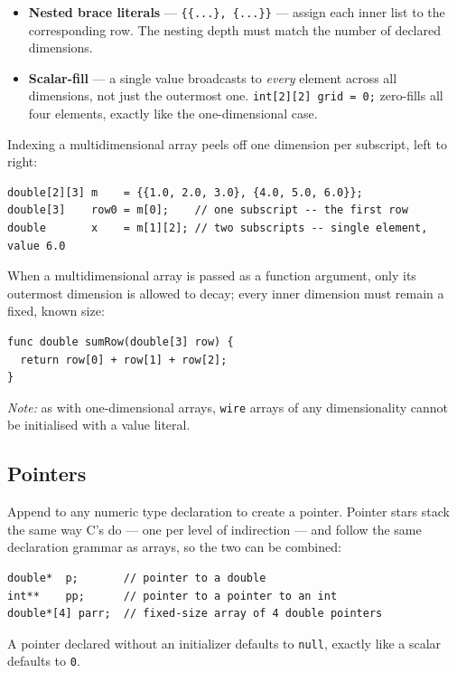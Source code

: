 \documentclass[11pt, a4paper]{article}
\newcommand{\code}[1]{\texttt{\small #1}}
\begin{document}
\begin{itemize}
  \item \textbf{Nested brace literals} — \code{\{\{...\}, \{...\}\}} — assign each inner list to the corresponding row. The nesting depth must match the number of declared dimensions.
  \item \textbf{Scalar-fill} — a single value broadcasts to \emph{every} element across all dimensions, not just the outermost one. \code{int[2][2] grid = 0;} zero-fills all four elements, exactly like the one-dimensional case.
\end{itemize}

Indexing a multidimensional array peels off one dimension per subscript, left to right:

\begin{lstlisting}
double[2][3] m    = {{1.0, 2.0, 3.0}, {4.0, 5.0, 6.0}};
double[3]    row0 = m[0];    // one subscript -- the first row
double       x    = m[1][2]; // two subscripts -- single element, value 6.0
\end{lstlisting}

When a multidimensional array is passed as a function argument, only its outermost dimension is allowed to decay; every inner dimension must remain a fixed, known size:

\begin{lstlisting}
func double sumRow(double[3] row) {
  return row[0] + row[1] + row[2];
}
\end{lstlisting}

\textit{Note:} as with one-dimensional arrays, \code{wire} arrays of any dimensionality cannot be initialised with a value literal.

\subsection{Pointers}

Append \code{*} to any numeric type declaration to create a pointer. Pointer stars stack the same way C's do — one \code{*} per level of indirection — and follow the same declaration grammar as arrays, so the two can be combined:

\begin{lstlisting}
double*  p;       // pointer to a double
int**    pp;      // pointer to a pointer to an int
double*[4] parr;  // fixed-size array of 4 double pointers
\end{lstlisting}

A pointer declared without an initializer defaults to \code{null}, exactly like a scalar defaults to \code{0}.
\end{document}
